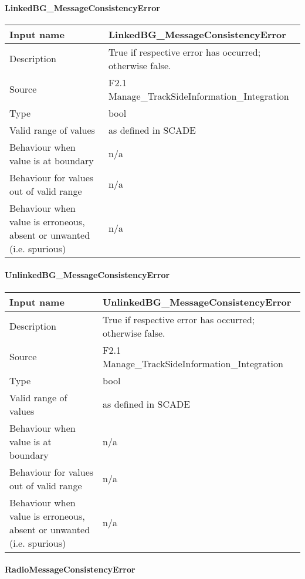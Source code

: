 \paragraph{LinkedBG\_MessageConsistencyError}

\begin{longtable}{p{}p{}}
\toprule
Input name				& LinkedBG\_MessageConsistencyError \\
\midrule
Description				& True if respective error has occurred; otherwise false. \\
\midrule
Source					& F2.1 Manage\_TrackSideInformation\_Integration \\ 
\midrule
Type					& bool \\
\midrule
Valid range of values	& as defined in SCADE \\
\midrule
Behaviour when value is at boundary	& n/a \\
\midrule
Behaviour for values out of valid range	& n/a \\
\midrule
Behaviour when value is erroneous, absent or unwanted (i.e. spurious) & n/a \\
\bottomrule
\end{longtable}

\paragraph{UnlinkedBG\_MessageConsistencyError}

\begin{longtable}{p{}p{}}
\toprule
Input name				& UnlinkedBG\_MessageConsistencyError \\
\midrule
Description				& True if respective error has occurred; otherwise false. \\
\midrule
Source					& F2.1 Manage\_TrackSideInformation\_Integration \\ 
\midrule
Type					& bool \\
\midrule
Valid range of values	& as defined in SCADE \\
\midrule
Behaviour when value is at boundary	& n/a \\
\midrule
Behaviour for values out of valid range	& n/a \\
\midrule
Behaviour when value is erroneous, absent or unwanted (i.e. spurious) & n/a \\
\bottomrule
\end{longtable}

\paragraph{RadioMessageConsistencyError}

